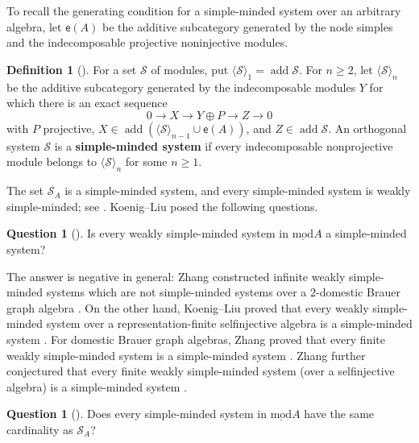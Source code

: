\documentclass[11pt]{article}
\newcommand{\add}{\operatorname{add}}
\newcommand{\smod}{\operatorname{\underline{mod}}}
\theoremstyle{definition}
\newtheorem{definition}[theorem]{Definition}
\newtheorem{question}[theorem]{Question}
\begin{document}
		To recall the generating condition for a simple-minded system over an arbitrary algebra, let $\mathsf e(A)$ be the additive subcategory generated by the node simples and the indecomposable projective noninjective modules.

		\begin{definition}[{\cite[Definition~2.1]{KL12}}]\label{definition of sms}
			For a set $\mathcal S$ of modules, put $\langle\mathcal S\rangle_1=\add\mathcal S$.
			For $n\geq2$, let $\langle\mathcal S\rangle_n$ be the additive subcategory generated by the indecomposable modules $Y$ for which there is an exact sequence
			\[
				0\longrightarrow X\longrightarrow Y\oplus P\longrightarrow Z\longrightarrow0
			\]
			with $P$ projective, $X\in\add(\langle\mathcal S\rangle_{n-1}\cup\mathsf e(A))$, and $Z\in\add\mathcal S$. An orthogonal system $\mathcal S$ is a \textbf{simple-minded system} if every indecomposable nonprojective module belongs to $\langle\mathcal S\rangle_n$ for some $n\geq1$.
		\end{definition}

		The set $\mathcal S_A$ is a simple-minded system, and every simple-minded system is weakly simple-minded; see \cite[Lemma~2.3 and Remark~5.4]{KL12}. Koenig--Liu posed the following questions.

		\begin{question}[{\cite[Remark~5.4]{KL12}}]\label{question of weak sms generation}
			Is every weakly simple-minded system in $\smod A$ a simple-minded system?
		\end{question}

		The answer is negative in general: Zhang constructed infinite weakly simple-minded systems which are not simple-minded systems over a $2$-domestic Brauer graph algebra \cite{Zha24BGA}. On the other hand, Koenig--Liu proved that every weakly simple-minded system over a representation-finite selfinjective algebra is a simple-minded system \cite[Theorem~5.6]{KL12}. For domestic Brauer graph algebras, Zhang proved that every finite weakly simple-minded system is a simple-minded system \cite[Corollary~3.5]{Zha26BGAII}.
		Zhang further conjectured that every finite weakly simple-minded system (over a selfinjective algebra) is a simple-minded system \cite[Conjecture~5.18]{Zha25}.

		\begin{question}[{\cite[Question~6.1]{KL12}}]\label{question of sms cardinality}
			Does every simple-minded system in $\smod A$ have the same cardinality as $\mathcal S_A$?
		\end{question}
\end{document}
